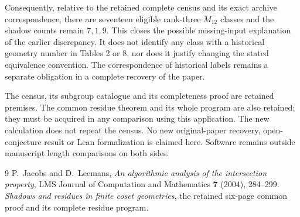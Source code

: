 \documentclass[11pt,a4paper]{article}
\begin{document}
Consequently, relative to the retained complete census and its exact
archive correspondence, there are seventeen eligible rank-three
$M_{12}$ classes and the shadow counts remain $7,1,9$. This closes
the possible missing-input explanation of the earlier discrepancy.
It does not identify any class with a historical geometry number in
Tables 2 or 8, nor does it justify changing the stated equivalence
convention. The correspondence of historical labels remains a separate
obligation in a complete recovery of the paper.

The census, its subgroup catalogue and its completeness proof are
retained premises. The common residue theorem and its whole program
are also retained; they must be acquired in any comparison using this
application. The new calculation does not repeat the census. No
new original-paper recovery, open-conjecture result or Lean
formalization is claimed here. Software remains outside manuscript
length comparisons on both sides.

\begin{thebibliography}{9}
 P.~Jacobs and D.~Leemans,
\emph{An algorithmic analysis of the intersection property},
LMS Journal of Computation and Mathematics \textbf{7} (2004), 284--299.
 \emph{Shadows and residues in finite coset geometries},
the retained six-page common proof and its complete residue program.
\end{thebibliography}
\end{document}
